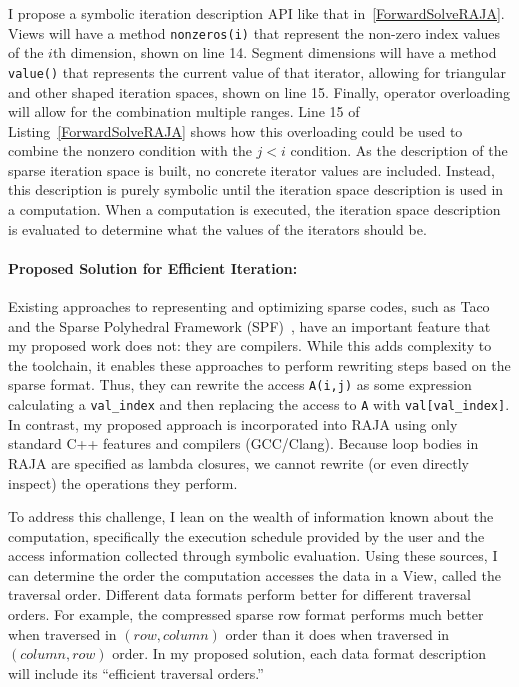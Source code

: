 \documentclass{article}
\begin{document}
I propose a symbolic iteration description API like that in~\autoref{ForwardSolveRAJA}.
Views will have a method \verb.nonzeros(i). that represent the non-zero index values of the $i$th dimension, shown on line 14. 
Segment dimensions will have a method \verb.value(). that represents the current value of that iterator, allowing for triangular and other shaped iteration spaces, shown on line 15.
Finally, operator overloading will allow for the combination multiple ranges.
Line 15 of Listing~\ref{ForwardSolveRAJA} shows how this overloading could be used to combine the nonzero condition with the $j < i$ condition.
As the description of the sparse iteration space is built, no concrete iterator values are included.
Instead, this description is purely symbolic until the iteration space description is used in a computation. 
When a computation is executed, the iteration space description is evaluated to determine what the values of the iterators should be.



\paragraph{Proposed Solution for Efficient Iteration:}
Existing approaches to representing and optimizing sparse codes, such as Taco and the Sparse Polyhedral Framework (SPF)~\cite{strout2016approach}, have an important feature that my proposed work does not: they are compilers.
While this adds complexity to the toolchain, it enables these approaches to perform rewriting steps based on the sparse format.
Thus, they can rewrite the access \verb.A(i,j). as some expression calculating a \verb.val_index. and then replacing the access to \verb.A. with \verb.val[val_index]..
In contrast, my proposed approach is incorporated into RAJA using only standard C++ features and compilers (GCC/Clang).
Because loop bodies in RAJA are specified as lambda closures, we cannot rewrite (or even directly inspect) the operations they perform.

To address this challenge, I lean on the wealth of information known about the computation, specifically the execution schedule provided by the user and the access information collected through symbolic evaluation. 
Using these sources, I can determine the order the computation accesses the data in a View, called the traversal order.
Different data formats perform better for different traversal orders.
For example, the compressed sparse row format performs much better when traversed in $(row,column)$ order than it does when traversed in $(column,row)$ order. 
In my proposed solution, each data format description will include its \enquote{efficient traversal orders.}
\end{document}

